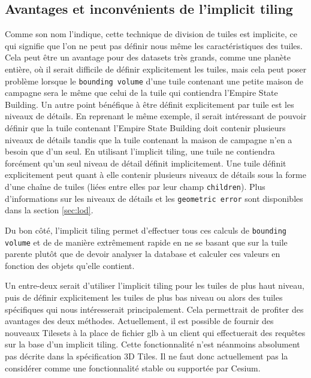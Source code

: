 \newpage
\subsection{Avantages et inconvénients de l'implicit tiling}

Comme son nom l'indique, cette technique de division de tuiles est implicite, ce qui signifie que l'on ne peut pas définir nous même les caractéristiques des tuiles. Cela peut être un avantage pour des datasets très grands, comme une planète entière, où il serait difficile de définir explicitement les tuiles, mais cela peut poser problème lorsque le \texttt{bounding volume} d'une tuile contenant une petite maison de campagne sera le même que celui de la tuile qui contiendra l'Empire State Building. Un autre point bénéfique à être définit explicitement par tuile est les niveaux de détails. En reprenant le même exemple, il serait intéressant de pouvoir définir que la tuile contenant l'Empire State Building doit contenir plusieurs niveaux de détails tandis que la tuile contenant la maison de campagne n'en a besoin que d'un seul. En utilisant l'implicit tiling, une tuile ne contiendra forcément qu'un seul niveau de détail définit implicitement. Une tuile définit explicitement peut quant à elle contenir plusieurs niveaux de détails sous la forme d'une chaîne de tuiles (liées entre elles par leur champ \texttt{children}). Plus d'informations sur les niveaux de détails et les \texttt{geometric error} sont disponibles dans la section \ref{sec:lod}.


Du bon côté, l'implicit tiling permet d'effectuer tous ces calculs de \texttt{bounding volume} et de  de manière extrêmement rapide en ne se basant que sur la tuile parente plutôt que de devoir analyser la database et calculer ces valeurs en fonction des objets qu'elle contient.

Un entre-deux serait d'utiliser l'implicit tiling pour les tuiles de plus haut niveau, puis de définir explicitement les tuiles de plus bas niveau ou alors des tuiles spécifiques qui nous intéresserait principalement. Cela permettrait de profiter des avantages des deux méthodes. Actuellement, il est possible de fournir des nouveaux Tilesets à la place de fichier glb à un client qui effectuerait des requêtes sur la base d'un implicit tiling. Cette fonctionnalité n'est néanmoins absolument pas décrite dans la spécification 3D Tiles. Il ne faut donc actuellement pas la considérer comme une fonctionnalité stable ou supportée par Cesium.

